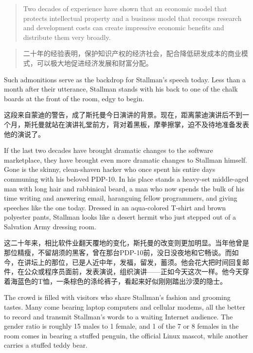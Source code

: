 \ifdefined\eng
\begin{quote}
Two decades of experience have shown that an economic model that protects intellectual property and a business model that recoups research and development costs can create impressive economic benefits and distribute them very broadly.
\end{quote}
\fi

\ifdefined\chs
\begin{quote}
二十年的经验表明，保护知识产权的经济社会，配合降低研发成本的商业模式，可以极大地促进经济发展和财富分配。
\end{quote}

\fi

\ifdefined\eng
Such admonitions serve as the backdrop for Stallman's speech today. Less than a month after their utterance, Stallman stands with his back to one of the chalk boards at the front of the room, edgy to begin.
\fi

\ifdefined\chs
这段来自蒙迪的警告，成了斯托曼今日演讲的背景。现在，距离蒙迪演讲后不到一个月，斯托曼就站在演讲礼堂前方，背对着黑板，摩拳擦掌，迫不及待地准备发表他的演说了。
\fi

\ifdefined\eng
If the last two decades have brought dramatic changes to the software marketplace, they have brought even more dramatic changes to Stallman himself. Gone is the skinny, clean-shaven hacker who once spent his entire days communing with his beloved PDP-10. In his place stands a heavy-set middle-aged man with long hair and rabbinical beard, a man who now spends the bulk of his time writing and answering email, haranguing fellow programmers, and giving speeches like the one today. Dressed in an aqua-colored T-shirt and brown polyester pants, Stallman looks like a desert hermit who just stepped out of a Salvation Army dressing room.
\fi

\ifdefined\chs
这二十年来，相比软件业翻天覆地的变化，斯托曼的改变则更加明显。当年他曾是那位精瘦，不留胡须的黑客，曾在那台PDP-10前，没日没夜地和它畅谈。而如今，在讲坛上的那位，已是人近中年，发福，留发，蓄须。他会花大把时间回复邮件，在公众或程序员面前，发表演说，组织演讲——正如今天这次一样。他今天穿着海蓝色的T恤，一条棕色的涤纶裤子，看起来好似刚刚踏出沙漠的隐士。
\fi

\ifdefined\eng
The crowd is filled with visitors who share Stallman's fashion and grooming tastes. Many come bearing laptop computers and cellular modems, all the better to record and transmit Stallman's words to a waiting Internet audience. The gender ratio is roughly 15 males to 1 female, and 1 of the 7 or 8 females in the room comes in bearing a stuffed penguin, the official Linux mascot, while another carries a stuffed teddy bear.
\fi

